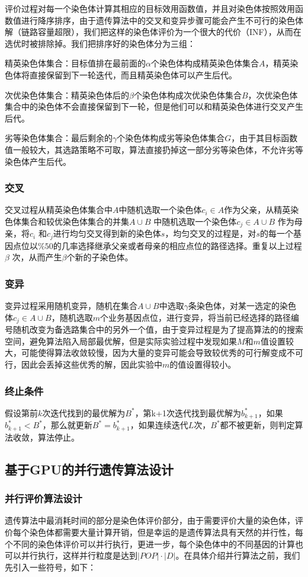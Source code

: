 评价过程对每一个染色体计算其相应的目标效用函数值，并且对染色体按照效用函数值进行降序排序，由于遗传算法中的交叉和变异步骤可能会产生不可行的染色体解（链路容量超限），我们把这样的染色体评价为一个很大的代价（INF），从而在选优时被排除掉。我们把排序好的染色体分为三组：

精英染色体集合：目标值排在最前面的$\alpha$个染色体构成精英染色体集合$A$，精英染色体将直接保留到下一轮迭代，而且精英染色体可以产生后代。

次优染色体集合：精英染色体后的$\beta$个染色体构成次优染色体集合$B$，次优染色体集合中的染色体不会直接保留到下一轮，但是他们可以和精英染色体进行交叉产生后代。

劣等染色体集合：最后剩余的$\gamma$个染色体构成劣等染色体集合$G$，由于其目标函数值一般较大，其选路策略不可取，算法直接扔掉这一部分劣等染色体，不允许劣等染色体产生后代。
\subsubsection{交叉}
交叉过程从精英染色体集合中$A$中随机选取一个染色体$c_i \in A$作为父亲，从精英染色体集合和较优染色体集合的并集$A \cup B$ 中随机选取一个染色体$c_j \in A \cup B$ 作为母亲，将$c_i$ 和$c_j$进行均匀交叉得到新的染色体$s$，均匀交叉的过程是，对$s$的每一个基因点位以$\%50$的几率选择继承父亲或者母亲的相应点位的路径选择。重复以上过程$\beta$ 次，从而产生$\beta$个新的子染色体。
\subsubsection{变异}
变异过程采用随机变异，随机在集合$A \cup B$中选取$\gamma$条染色体，对某一选定的染色体$c_j \in A \cup B$，随机选取$m$个业务基因点位，进行变异，将当前已经选择的路径编号随机改变为备选路集合中的另外一个值，由于变异过程是为了提高算法的的搜索空间，避免算法陷入局部最优解，但是实际实验过程中发现如果$M$和$m$值设置较大，可能使得算法收敛较慢，因为大量的变异可能会导致较优秀的可行解变成不可行，因此会丢掉这些优秀的解，因此实验中$m$的值设置得较小。
\subsubsection{终止条件}
假设第前$k$次迭代找到的最优解为$B^*$，第k+1次迭代找到最优解为$b_{k+1}^*$，如果$b_{k+1}^*<B^*$，那么就更新$B^*=b_{k+1}^*$，如果连续迭代$L$次，$B^*$都不被更新，则判定算法收敛，算法停止。
\subsection{基于GPU的并行遗传算法设计}
\subsubsection{并行评价算法设计}
遗传算法中最消耗时间的部分是染色体评价部分，由于需要评价大量的染色体，评价每个染色体都需要大量计算开销，但是幸运的是遗传算法具有天然的并行性，每个不同的染色体评价可以并行执行，更进一步，每个染色体中的不同基因的计算也可以并行执行，这样并行粒度是达到$|POP|\cdot|D|$。在具体介绍并行算法之前，我们先引入一些符号，如下：


